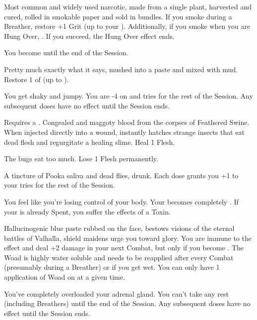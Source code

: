 
  Most common and widely used narcotic, made from a single plant, harvested and cured, rolled in smokable paper and sold in bundles.  If you smoke during a Breather, restore +1 Grit (up to your \MAX).  Additionally, if you smoke when you are Hung Over, .  If you succeed, the Hung Over effect ends.

    You become  until the end of the Session.


  Pretty much exactly what it says, mushed into a paste and mixed with mud. Restore 1 \UD of \TAL (up to \MAX).

   You get shaky and jumpy. You are -4 on  \RO and \RS tries for the rest of the Session. Any subsequent doses have no effect until the Session ends.


   Requires a . Congealed and maggoty blood from the corpses of Feathered Swine. When injected directly into a wound, instantly hatches strange insects that eat dead flesh and regurgitate a healing slime.  Heal 1 Flesh.

   The bugs eat too much. Lose 1 Flesh permanently.


    A tincture of Pooka saliva and dead flies, drunk. Each dose grants you +1 to your \DEX tries for the rest of the Session.

   You feel like you're losing control of your body. Your \TAL becomes completely . If your \TAL is already Spent, you suffer the effects of a  Toxin.


\cbreak



  Hallucinogenic blue paste rubbed on the face, bestows visions of the eternal battles of Valhalla, shield maidens urge you toward glory. You are immune to the effect  and deal +2 damage in your next Combat, but only if you become . The Woad is highly water soluble and needs to be reapplied after every Combat (presumably during a Breather) or if you get wet.  You can only have 1 application of Woad on at a given time.

   You've completely overloaded your adrenal gland. You can't take any rest (including Breathers) until the end of the Session. Any subsequent doses have no effect until the Session ends.




